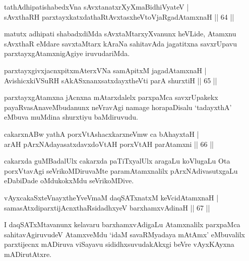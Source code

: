 
\begin{shl}
tathA\s dhipatishabedxVna sAvxtanatxrXyXmaBidhiVyateV |\\
sAvxthaRH parxtayxkatxdathaRtAvxtasxheVtoVjaRgadAtamxnaH \hfill || 64 ||
\end{shl}	

\begin{artha}
matutx adhipati shabadxdiMda sAvxtaMtarxyXvanunx heVLide, Atamxnu sAvxthaR eMdare savxtaMtarx kAraNa sahitavAda jagatitxna savxrUpavu parxtayxgAtamxnigAgiye iruvudariMda.
\end{artha}


\begin{shl}
parxtayxgivxjacnxpitxmAterxVNa samApitxM jagadAtamxnaH |\\
AvishicxkiVSuRH sAkASxnanxsatxdayxtheVti parA shurxtiH \hfill || 65 ||
\end{shl}

\begin{artha}
parxtayxgAtamxna jAcnxna mAtarxdalelx parxpaMca savxrUpakekx
payaRvasAnaveMbudanunx neVravAgi namage horapaDisalu `tadayxthA' eMbuva
muMdina shurxtiyu baMdiruvudu.
\end{artha}

\begin{shl}
cakarxnABw yathA porxVtAshacxkarxneVmw ca bAhayxtaH |\\
arAH pArxNAdayasatxdavxdoVtAH porxVtAH parAtamxni \hfill || 66 ||
\end{shl}

\begin{artha}
cakarxda guMBadalUlx cakarxda paTiTxyalUlx aragaLu koVlugaLu Ota porxVtavAgi seVrikoMDiruvaMte paramAtamxnalilx pArxNAdivasutxgaLu eDabiDade oMdukokxMdu seVrikoMDive.
\end{artha}


\begin{shl}
vAyxcakaSxteV\s nayxtheYveVmaM daqSATxnatxM keVcidAtamxnaH |\\
samasAtxdiparxtijAcnxthaRsidadhxyeV barxhamxvAdinaH \hfill || 67 ||
\end{shl}

\begin{artha}
I daqSATxMtavanunx kelavaru barxhamxvAdigaLu Atamxnalilx parxpaMca sahitavAgiruvudeV AtamxveMdu `idaM savaRMyadaya mAtAmx' eMbuvalilx parxtijecnx mADiruva viSayavu sididhxsuvudakAkxgi beVre vAyxKAyxna mADirutAtxre.
\end{artha}

